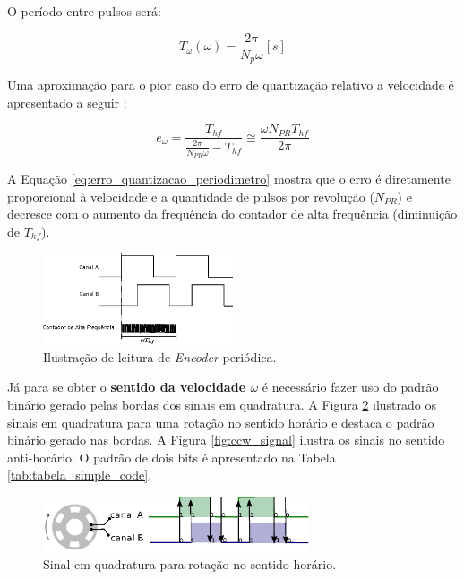 O período entre pulsos será:

\begin{equation}
    T_{\omega}(\omega) = \frac{2\pi}{N_{p}\omega} [s]
\end{equation}

Uma aproximação para o pior caso do erro de quantização relativo a velocidade é apresentado a seguir \cite{analise_incr_enc}:

\begin{equation}
    e_{\omega} = \frac{T_{hf}}{ \frac{2\pi}{N_{PR} \omega} - T_{hf} } \cong \frac{\omega N_{PR} T_{hf}}{2\pi}
    \label{eq:erro_quantizacao_periodimetro}
\end{equation}

A Equação \ref{eq:erro_quantizacao_periodimetro} mostra que o erro é diretamente proporcional à velocidade e a quantidade de pulsos por revolução ($N_{PR}$) e decresce com o aumento da frequência do contador de alta frequência (diminuição de $T_{hf}$).


\begin{figure}[H]
    \centering
    \includegraphics[width=0.5\textwidth]{figuras/ilustracoes/ilustracao_medicao_encoder_por_periodo.eps}
    \caption{Ilustração de leitura de \emph{Encoder} periódica.}
    \label{fig:ilustracao_periodimetro}
\end{figure}

Já para se obter o \textbf{sentido da velocidade $\omega$} é necessário fazer uso do padrão binário gerado pelas bordas dos sinais em quadratura. A Figura \ref{fig:cw_signal} ilustrado os sinais em quadratura para uma rotação no sentido horário e destaca o padrão binário gerado nas bordas. A Figura \ref{fig:ccw_signal} ilustra os sinais no sentido anti-horário. O padrão de dois bits é apresentado na Tabela \ref{tab:tabela_simple_code}. \\

\begin{figure}[H]
    \centering
    \includegraphics[width=0.7\textwidth]{figuras/ilustracoes/sinal_enquadratura_sentido_CW.eps}
    \caption{Sinal em quadratura para rotação no sentido horário.}
    \label{fig:cw_signal}
\end{figure}

